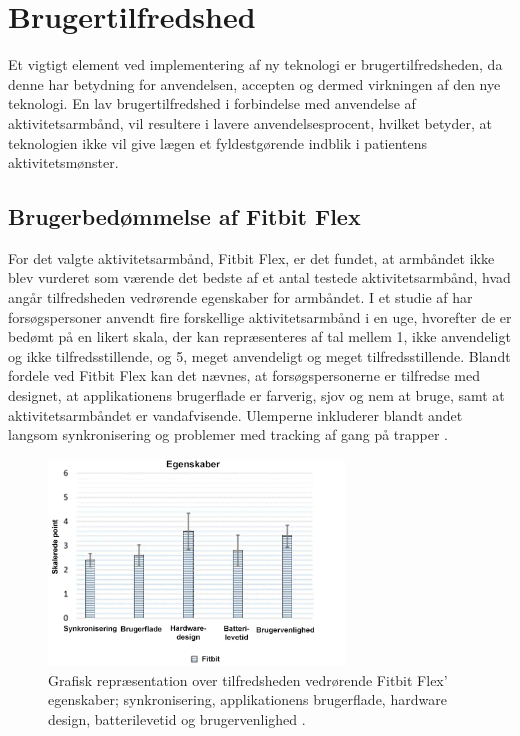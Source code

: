 \section{Brugertilfredshed}

Et vigtigt element ved implementering af ny teknologi er brugertilfredsheden, da denne har betydning for anvendelsen, accepten og dermed virkningen af den nye teknologi. En lav brugertilfredshed i forbindelse med anvendelse af aktivitetsarmbånd, vil resultere i lavere anvendelsesprocent, hvilket betyder, at teknologien ikke vil give lægen et fyldestgørende indblik i patientens aktivitetsmønster.

\subsection{Brugerbedømmelse af Fitbit Flex} \label{sec:brugerbedommelse}

For det valgte aktivitetsarmbånd, Fitbit Flex, er det fundet, at armbåndet ikke blev vurderet som værende det bedste af et antal testede aktivitetsarmbånd, hvad angår tilfredsheden vedrørende egenskaber for armbåndet. I et studie af \citeauthor{kaewkannate2016} har forsøgspersoner anvendt fire forskellige aktivitetsarmbånd i en uge, hvorefter de er bedømt på en likert skala, der kan repræsenteres af tal mellem 1, ikke anvendeligt og ikke tilfredsstillende, og 5, meget anvendeligt og meget tilfredsstillende. Blandt fordele ved Fitbit Flex kan det nævnes, at forsøgspersonerne er tilfredse med designet, at applikationens brugerflade er farverig, sjov og nem at bruge, samt at aktivitetsarmbåndet er vandafvisende. Ulemperne inkluderer blandt andet langsom synkronisering og problemer med tracking af gang på trapper \citep{kaewkannate2016}.

\begin{figure}[H]
	\centering
	\includegraphics[width=0.7\textwidth]{figures/FeatureSatisfaction2}
	\caption{Grafisk repræsentation over tilfredsheden vedrørende Fitbit Flex' egenskaber; synkronisering, applikationens brugerflade, hardware design, batterilevetid og brugervenlighed \citep{kaewkannate2016}.}
	\label{fig:FeatureSatisfaction}
\end{figure}

